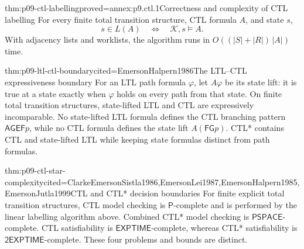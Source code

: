 \begin{hbtheorem}{thm:p09-ctl-labelling}{proved=annex:p9.ctl.1}{Correctness and complexity of CTL labelling}
For every finite total transition structure, CTL formula \(A\), and state
\(s\),
\[
 s\in L(A)\quad\Longleftrightarrow\quad\mathcal K,s\models A.
\]
With adjacency lists and worklists, the algorithm runs in
\(O((|S|+|R|)\,|A|)\) time.
\end{hbtheorem}

\begin{hbtheorem}{thm:p09-ltl-ctl-boundary}{cited=EmersonHalpern1986}{The LTL--CTL expressiveness boundary}
For an LTL path formula \(\varphi\), let \(A\varphi\) be its state lift: it is
true at a state exactly when \(\varphi\) holds on every path from that state.
On finite total transition structures, state-lifted LTL and CTL are
expressively incomparable.  No state-lifted LTL formula defines the CTL
branching pattern \(\mathsf{AG}\mathsf{EF}p\), while no CTL formula defines the
state lift \(A(\mathsf F\mathsf Gp)\).  CTL* contains CTL and state-lifted LTL
while keeping state formulas distinct from path formulas.
\end{hbtheorem}

\begin{hbtheorem}{thm:p09-ctl-star-complexity}{cited=ClarkeEmersonSistla1986,EmersonLei1987,EmersonHalpern1985,EmersonJutla1999}{CTL and CTL* decision boundaries}
For finite explicit total transition structures, CTL model checking is
\(\mathsf P\)-complete and is performed by the linear labelling algorithm
above.  Combined CTL* model checking is \(\mathsf{PSPACE}\)-complete.  CTL
satisfiability is \(\mathsf{EXPTIME}\)-complete, whereas CTL* satisfiability is
\(\mathsf{2EXPTIME}\)-complete.  These four problems and bounds are distinct.
\end{hbtheorem}

